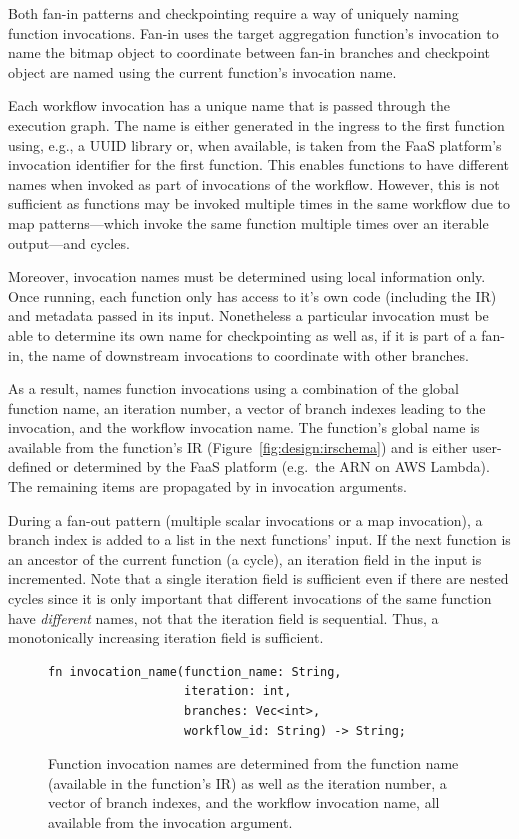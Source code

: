 Both fan-in patterns and checkpointing require a way of uniquely naming function
invocations. Fan-in uses the target aggregation function's invocation to name
the bitmap object to coordinate between fan-in branches and checkpoint object
are named using the current function's invocation name.

Each workflow invocation has a unique name that is passed through the execution
graph. The name is either generated in the ingress to the first function using,
e.g., a UUID library or, when available, is taken from the FaaS platform's
invocation identifier for the first function. This enables functions to have
different names when invoked as part of invocations of the workflow. However,
this is not sufficient as functions may be invoked multiple times in the same
workflow due to map patterns---which invoke the same function multiple times over
an iterable output---and cycles.

Moreover, invocation names must be determined using local information only. Once
running, each function only has access to it's own code (including the IR) and
metadata passed in its input. Nonetheless a particular invocation must be able
to determine its own name for checkpointing as well as, if it is part of a
fan-in, the name of downstream invocations to coordinate with other branches.

As a result, \name{} names function invocations using a combination of the
global function name, an iteration number, a vector of branch indexes leading to
the invocation, and the workflow invocation name. The function's global name is
available from the function's IR (Figure~\ref{fig:design:irschema}) and is
either user-defined or determined by the FaaS platform (e.g.\ the ARN on AWS
Lambda). The remaining items are propagated by \name{} in invocation arguments.

During a fan-out pattern (multiple scalar invocations or a map invocation), a
branch index is added to a list in the next functions' input. If the next
function is an ancestor of the current function (a cycle), an iteration field in
the input is incremented. Note that a single iteration field is sufficient even
if there are nested cycles since it is only important that different invocations
of the same function have \emph{different} names, not that the iteration field
is sequential. Thus, a monotonically increasing iteration field is sufficient.

\begin{figure}
\begin{verbatim}
fn invocation_name(function_name: String,
                   iteration: int,
                   branches: Vec<int>,
                   workflow_id: String) -> String;
\end{verbatim}
\label{fig:design:names}
\caption{Function invocation names are determined from the function name
(available in the function's IR) as well as the iteration number, a vector of
branch indexes, and the workflow invocation name, all available from the
invocation argument.}
\end{figure}

